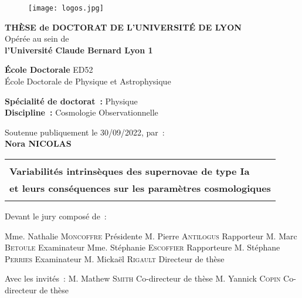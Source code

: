 \documentclass[../main/main.tex]{subfiles}
\begin{document}
\frontmatter

\begin{titlepage}
    \begin{center}
        \begin{figure}[h]
            \centering
            \texttt{[image: logos.jpg]}
        \end{figure}

        \vfill

        {\large\bfseries THÈSE de DOCTORAT DE L'UNIVERSITÉ DE LYON\\}
        {Opérée au sein de\\}
        {\large \bfseries l'Université Claude Bernard Lyon 1\\}
        \bigbreak

        {\large \textbf{École Doctorale} ED52\\
        École Doctorale de Physique et Astrophysique}
        \bigbreak

        {\large \textbf{Spécialité de doctorat~:} Physique \\}
        {\large \textbf{Discipline~:} Cosmologie Observationnelle}

        \vfill

        {Soutenue publiquement le 30/09/2022, par~:\\}
        {\Large\bfseries {Nora NICOLAS}\\}
        \vspace{0.5cm}
        \begin{adjustwidth}{-10pt}{-10pt}
        \begin{tabularx}{\linewidth}{Y}
            \toprule
            \\
            \Large \bfseries Variabilités intrinsèques des supernovae de type Ia\\
            \Large \bfseries et leurs conséquences sur les paramètres
            cosmologiques\\
            \\[-0.2em]
            \bottomrule
        \end{tabularx}
        \end{adjustwidth}

        \vfill

    \end{center}

\vfill

Devant le jury composé de~:\bigbreak

Mme. Nathalie \textsc{Moncoffre} \hfill Présidente\smallbreak
M. Pierre \textsc{Antilogus} \hfill Rapporteur\smallbreak
M. Marc \textsc{Betoule} \hfill Examinateur\smallbreak
Mme. Stéphanie \textsc{Escoffier} \hfill Rapporteure\smallbreak
M. Stéphane \textsc{Perries} \hfill Examinateur\smallbreak
M. Mickaël \textsc{Rigault} \hfill Directeur de thèse\bigbreak

Avec les invités~:\bigbreak
M. Mathew \textsc{Smith} \hfill Co-directeur de thèse\smallbreak
M. Yannick \textsc{Copin} \hfill Co-directeur de thèse\smallbreak

\vfill

\end{titlepage}
\end{document}
